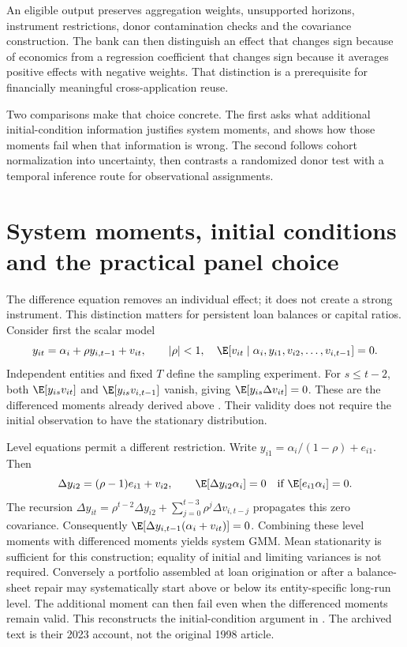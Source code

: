 An eligible output preserves aggregation weights, unsupported horizons,
instrument restrictions, donor contamination checks and the covariance
construction. The bank can then distinguish an effect that changes
sign because of economics from a regression coefficient that changes
sign because it averages positive effects with negative weights.
That distinction is a prerequisite for financially meaningful
cross-application reuse.

Two comparisons make that choice concrete. The first asks what additional
initial-condition information justifies system moments, and shows how those
moments fail when that information is wrong. The second follows cohort
normalization into uncertainty, then contrasts a randomized donor test
with a temporal inference route for observational assignments.



\section{System moments, initial conditions and the practical panel choice}
\label{s5:dynamic-panel}
The difference equation removes an individual effect; it does not create a
strong instrument. This distinction matters for persistent loan balances or
capital ratios. Consider first the scalar model
\[
 y_{it}=\alpha_i+\rho y_{i,t-1}+v_{it},\qquad |\rho|<1,
 \quad \E[v_{it}\mid\alpha_i,y_{i1},v_{i2},\ldots,v_{i,t-1}]=0.
\]
Independent entities and fixed $T$ define the sampling experiment. For
$s\le t-2$, both $\E[y_{is}v_{it}]$ and $\E[y_{is}v_{i,t-1}]$ vanish, giving
$\E[y_{is}\Delta v_{it}]=0$. These are the differenced moments already
derived above \citep{arellano1991}. Their validity does not require the
initial observation to have the stationary distribution.

Level equations permit a different restriction. Write
$y_{i1}=\alpha_i/(1-\rho)+e_{i1}$. Then
\[
 \Delta y_{i2}=(\rho-1)e_{i1}+v_{i2},\qquad
 \E[\Delta y_{i2}\alpha_i]=0
 \quad\text{if }\E[e_{i1}\alpha_i]=0.
\]
The recursion
$\Delta y_{it}=\rho^{t-2}\Delta y_{i2}+
\sum_{j=0}^{t-3}\rho^j\Delta v_{i,t-j}$ propagates this zero covariance.
Consequently $\E[\Delta y_{i,t-1}(\alpha_i+v_{it})]=0$.
Combining these level moments with differenced moments yields system GMM.
Mean stationarity is sufficient for this construction; equality of initial
and limiting variances is not required. Conversely a portfolio assembled at
loan origination or after a balance-sheet repair may systematically start
above or below its entity-specific long-run level. The additional moment can
then fail even when the differenced moments remain valid. This reconstructs
the initial-condition argument in \citet[Sections 3.1--3.3, pp.107--109]{blundellbond2023}.
The archived text is their 2023 account, not the original 1998 article.

